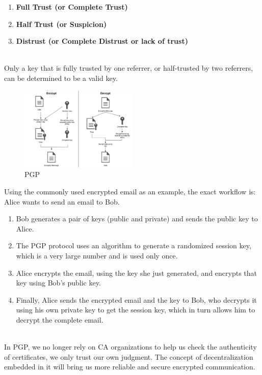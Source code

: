 \begin{enumerate}[]
    \item \textbf{Full Trust (or Complete Trust)}
    \item \textbf{Half Trust (or Suspicion)}
    \item \textbf{Distrust (or Complete Distrust or lack of trust)}
\end{enumerate}
\\
Only a key that is fully trusted by one referrer, or half-trusted by two referrers, 
can be determined to be a valid key.

\begin{figure}[H] %
    \centering %
    \includegraphics[width=0.5\textwidth]{figures/PGP.png} %
    \caption{PGP} %
    \label{Fig.6: PGP} %
\end{figure}

Using the commonly used encrypted email as an example, the exact 
workflow is:
\\
Alice wants to send an email to Bob.
\begin{enumerate}[]
    \item Bob generates a pair of keys (public and private) and sends 
    the public key to Alice.
    \item The PGP protocol uses an algorithm to generate a randomized 
    session key, which is a very large number and is used only once.
    \item Alice encrypts the email, using the key she just generated, 
    and encrypts that key using Bob's public key.
    \item Finally, Alice sends the encrypted email and the key to 
    Bob, who decrypts it using his own private key to get the 
    session key, which in turn allows him to decrypt the complete email.
\end{enumerate}
\\
In PGP, we no longer rely on CA organizations to help us check the authenticity of 
certificates, we only trust our own judgment. The concept of decentralization embedded 
in it will bring us more reliable and secure encrypted communication\cite{b12}.


